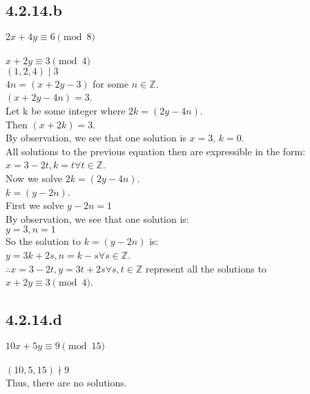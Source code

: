 \documentclass{article}
\begin{document}
\subsection{4.2.14.b}
$2x + 4y \equiv 6 \pmod{8}$
\\
\\$x + 2y \equiv 3 \pmod{4}$
\\$(1, 2, 4) \mid 3$
\\$4n = (x + 2y - 3)$ for some $n \in \mathbb{Z}$.
\\$(x + 2y - 4n) = 3$.
\\Let k be some integer where $2k = (2y - 4n)$.
\\Then $(x + 2k) = 3$.
\\By observation, we see that one solution is $x=3,\,k=0$.
\\All solutions to the previous equation then are expressible in the form:
\\$x=3-2t, k=t$\;\;$\forall t \in \mathbb{Z}$.
\\Now we solve $2k = (2y - 4n)$.
\\$k = (y - 2n)$.
\\First we solve $y-2n = 1$
\\By observation, we see that one solution is:
\\$y=3, n=1$
\\So the solution to $k = (y - 2n)$ is:
\\$y=3k+2s, n=k-s$\;\;$\forall s \in \mathbb{Z}$.
\\$\therefore x=3-2t, y=3t+2s$\;\;$\forall s,t \in \mathbb{Z}$ represent all the solutions to $x + 2y \equiv 3 \pmod{4}$.

\subsection{4.2.14.d}
$10x + 5y \equiv 9 \pmod{15}$
\\
\\$(10, 5, 15) \nmid 9$
\\Thus, there are no solutions.
\end{document}
